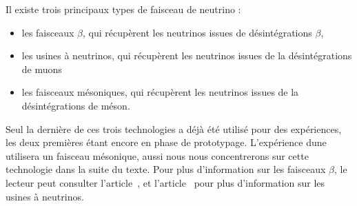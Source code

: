 	         Il existe trois principaux types de faisceau de neutrino :
	         \begin{itemize}
	             \item les faisceaux $\beta$, qui récupèrent les neutrinos issues de désintégrations $\beta$,
	             \item les usines à neutrinos, qui récupèrent les neutrinos issues de la désintégrations de muons
	             \item les faisceaux mésoniques, qui récupèrent les neutrinos issues de la désintégrations de méson.
	         \end{itemize}
	         Seul la dernière de ces trois technologies a déjà été utilisé pour des expériences, les deux premières étant encore en phase de prototypage. L'expérience \gls{dune} utilisera un faisceau mésonique, aussi nous nous concentrerons sur cette technologie dans la suite du texte. Pour plus d'information sur les faisceaux $\beta$, le lecteur peut consulter l'article~\cite{Wildner2012}, et l'article~\cite{Bogomilov2014} pour plus d'information sur les usines à neutrinos.
	         
	         
	         
